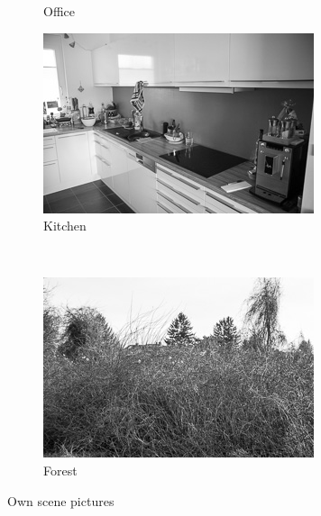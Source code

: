 \documentclass[subfigure,epsfig,fleqn,float,numbers=noenddot]{scrartcl}
\begin{document}
\begin{figure}
\begin{subfigure}[b]{0.3\textwidth}
                \caption{Office}
                \label{fig:office}
        \end{subfigure}
				
				\begin{subfigure}[b]{0.3\textwidth}
                \includegraphics[width=\textwidth]{img/own/kitchen}
                \caption{Kitchen}
                \label{fig:kitchen}
        \end{subfigure}
				~
				\begin{subfigure}[b]{0.3\textwidth}
                \includegraphics[width=\textwidth]{img/own/forest}
                \caption{Forest}
                \label{fig:forest}
        \end{subfigure}
        \caption{Own scene pictures}\label{fig:ownimages}
\end{figure}
\end{document}
